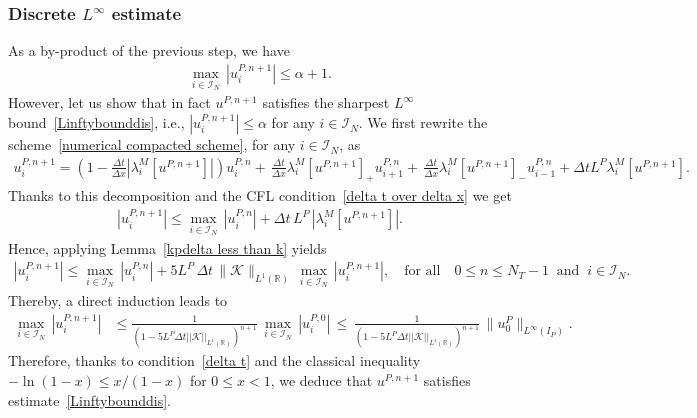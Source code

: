 \documentclass[11pt]{amsart}
\newcommand{\I}{\mathcal{I}_N}
\begin{document}
\subsubsection{Discrete $L^\infty$ estimate} As a by-product of the previous step, we have
\begin{align*}
    \max_{i \in \I} \, |u^{P,n+1}_i| \leq \alpha+1.
\end{align*}
However, let us show that in fact $u^{P,n+1}$ satisfies the sharpest $L^\infty$ bound~\eqref{Linftybounddis}, i.e., $|u^{P,n+1}_i| \leq \alpha$ for any $i \in \I$. We first rewrite the scheme~\eqref{numerical compacted scheme}, for any $i \in \I$, as
{\small\begin{multline*}
  u_i^{P, n + 1} = 
 \left(1 - \frac{\Delta t}{\Delta x}\left|\lambda^M_i[ u^{P, n + 1}]\right|\right) u_i^{P, n}+  \, \frac{\Delta t}{\Delta x}\lambda^M_i[ u^{P, n + 1}]_+ u_{i + 1}^{P, n}+  \, \frac{\Delta t}{\Delta x}\lambda^M_i[ u^{P, n + 1}]_- u_{i - 1}^{P, n} + \Delta t L^P\lambda^M_i[ u^{P, n + 1}].
\end{multline*}}
Thanks to this decomposition and the CFL condition~\eqref{delta t over delta x} we get
\begin{align*}
    |u^{P,n+1}_i|\leq \max_{i\in \I} \, |u^{P,n}_i|+ \Delta t \, L^P \, \left|\lambda^M_i[u^{P,n+1}]\right|.
\end{align*}
Hence, applying Lemma~\ref{kpdelta less than k} yields
  \begin{align*}
      |u_i^{P, n+ 1}| \leq \max_{i \in \I} \, |u_i^{P, n}| + 5L^P\, \Delta t \,\|\mathcal{K}\|_{L^1(\mathbb{R})} \, \max_{i\in\I} \, |u_i ^{P, n+ 1}|, \quad\mbox{for all}\quad 0\le n \le N_T-1
      \;\;\mbox{and} \;\; i \in \I.
  \end{align*}
Thereby, a direct induction leads to
\begin{align*}
     \max_{i \in \I}\, |u_i^{P, n+ 1}|
     &\leq  \frac{1}{(1 - 5 L^P \Delta t||\mathcal{K}||_{L^1(\mathbb{R})})^{n + 1}}\, \max_{i \in \I} \,|u_i^{P, 0}| \, \leq \, \frac{1}{(1 - 5 L^P \Delta t||\mathcal{K}||_{L^1(\mathbb{R})})^{n + 1}}\, \|u^P_0\|_{L^\infty(I_P)}.
\end{align*}
Therefore, thanks to condition~\eqref{delta t} and the classical inequality $-\ln(1-x)\leq x/(1-x)$ for $0\leq x < 1$, we deduce that $u^{P,n+1}$ satisfies estimate~\eqref{Linftybounddis}.
  
\end{document}
